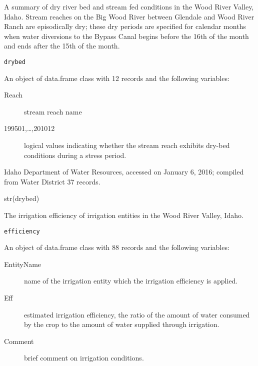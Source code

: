 \documentclass[a4paper]{book}
\begin{document}
%
\begin{Description}\relax
A summary of dry river bed and stream fed conditions in the Wood River Valley, Idaho.
Stream reaches on the Big Wood River between Glendale and Wood River Ranch are episodically dry;
these dry periods are specified for calendar months when water diversions to the
Bypass Canal begins before the 16th of the month and ends after the 15th of the month.
\end{Description}
%
\begin{Usage}
\begin{verbatim}
drybed
\end{verbatim}
\end{Usage}
%
\begin{Format}
An object of data.frame class with 12 records and the following variables:
\begin{description}

\item[Reach] stream reach name
\item[199501,\dots,201012] logical values indicating whether the stream reach exhibits
dry-bed conditions during a stress period.

\end{description}
\end{Format}
%
\begin{Source}\relax
Idaho Department of Water Resources, accessed on January 6, 2016;
compiled from Water District 37 records.
\end{Source}
%
\begin{Examples}
\begin{ExampleCode}
str(drybed)

\end{ExampleCode}
\end{Examples}
%
\begin{Description}\relax
The irrigation efficiency of irrigation entities in the Wood River Valley, Idaho.
\end{Description}
%
\begin{Usage}
\begin{verbatim}
efficiency
\end{verbatim}
\end{Usage}
%
\begin{Format}
An object of data.frame class with 88 records and the following variables:
\begin{description}

\item[EntityName] name of the irrigation entity which the irrigation efficiency is applied.
\item[Eff] estimated irrigation efficiency, the ratio of the amount of
water consumed by the crop to the amount of water supplied through irrigation.
\item[Comment] brief comment on irrigation conditions.

\end{description}
\end{Format}
\end{document}
